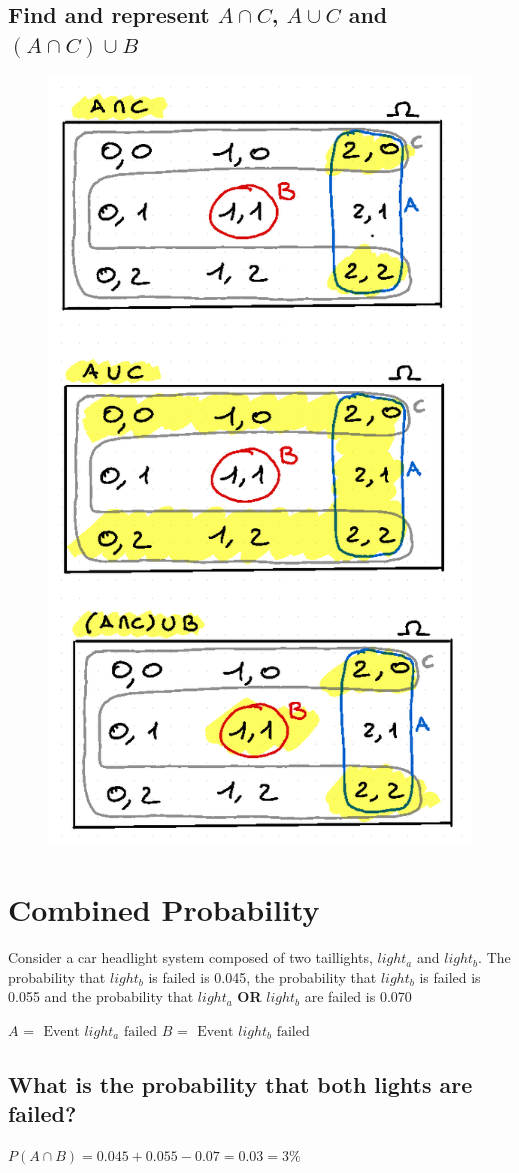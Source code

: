 \documentclass{article}
\begin{document}
\newpage
\subsection{Find and represent $A \cap C$, $A \cup C$ and $(A \cap C)\cup B$}
\begin{figure}[h]
    \centering
    \includegraphics[width=0.5\linewidth]{image3.png}
    
    
\end{figure}



\newpage
\section{Combined Probability}
Consider a car headlight system composed of two taillights, $light_a$ and
$light_b$.
The probability that $light_b$ is failed is 0.045, the probability that $light_b$ is
failed is 0.055 and the probability that $light_a$ \textbf{OR} $light_b$ are failed is 0.070

$A$ = $ \text{ Event $light_a$ failed}$
$B$ = $\text{ Event $light_b$ failed}$

\subsection{What is the probability that both lights are failed?}
$P(A \cap B) = 0.045 +0.055-0.07 = 0.03 = 3\%$
\end{document}
